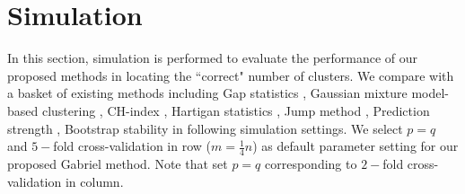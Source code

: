 \documentclass[11pt]{article}
\begin{document}
\section{Simulation}

In this section, simulation is performed to evaluate the performance of our
proposed methods in locating the ``correct" number of clusters. We compare
with a basket of existing methods including Gap statistics
\citep{tibshirani2001estimating}, Gaussian mixture model-based clustering
\citep{fraley2002model}, CH-index \citep{calinski1974dendrite}, Hartigan
statistics \citep{hartigan1975clustering}, Jump method
\citep{sugar2003finding}, Prediction strength \citep{tibshirani2005cluster},
Bootstrap stability \citep{fang2012selection} in following simulation
settings. We select $p=q$ and $5-$fold cross-validation in row
($m=\frac{1}{4}n$) as default parameter setting for our proposed Gabriel
method. Note that set $p=q$ corresponding to $2-$fold cross-validation in
column.
\end{document}
